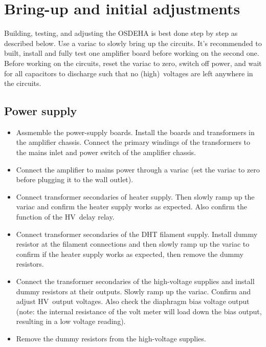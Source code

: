 \section{Bring-up and initial adjustments}

Building, testing, and adjusting the OSDEHA is best done step by step as described below. Use a variac to slowly bring up the circuits. It's recommended to built, install and fully test one amplifier board before working on the second one. Before working on the circuits, reset the variac to zero, switch off power, and wait for all capacitors to discharge such that no (high) voltages are left anywhere in the circuits.

\subsection{Power supply}
\begin{itemize}
\item Assmemble the power-supply boards. Install the boards and transformers in the amplifier chassis. Connect the primary windings of the transformers to the mains inlet and power switch of the amplifier chassis.
\item Connect the amplifier to mains power through a variac (set the variac to zero before plugging it to the wall outlet).
\item Connect transformer secondaries of heater supply. Then slowly ramp up the variac and confirm the heater supply works as expected. Also confirm the function of the HV delay relay.
\item Connect transformer secondaries of the DHT filament supply. Install dummy resistor at the filament connections and then slowly ramp up the variac to confirm if the heater supply works as expected, then remove the dummy resistors.
\item Connect the transformer secondaries of the high-voltage supplies and install dummy resistors at their outputs. Slowly ramp up the variac. Confirm and adjust HV output voltages. Also check the diaphragm bias voltage output (note: the internal resistance of the volt meter will load down the bias output, resulting in a low voltage reading).
\item Remove the dummy resistors from the high-voltage supplies.
\end{itemize}



